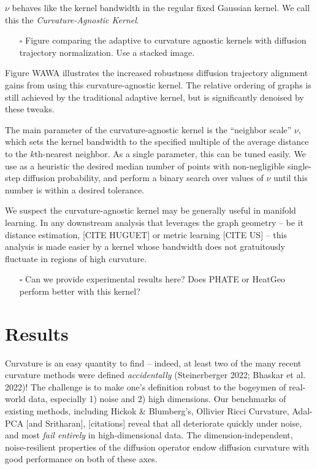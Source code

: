 \documentclass[
  letterpaper,
  DIV=11,
  numbers=noendperiod]{scrartcl}
\providecommand{\tightlist}{%
  \setlength{\itemsep}{0pt}\setlength{\parskip}{0pt}}\usepackage{longtable,booktabs,array}
\theoremstyle{plain}
\theoremstyle{definition}
\theoremstyle{plain}
\theoremstyle{definition}
\theoremstyle{plain}
\theoremstyle{remark}
\begin{document}
\(\nu\) behaves like the kernel bandwidth in the regular fixed Gaussian
kernel. We call this the \emph{Curvature-Agnostic Kernel}.

\begin{itemize}
\tightlist
\item[$\square$]
  Figure comparing the adaptive to curvature agnostic kernels with
  diffusion trajectory normalization. Use a stacked image.
\end{itemize}

Figure WAWA illustrates the increased robustness diffusion trajectory
alignment gains from using this curvature-agnostic kernel. The relative
ordering of graphs is still achieved by the traditional adaptive kernel,
but is significantly denoised by these tweaks.

The main parameter of the curvature-agnostic kernel is the ``neighbor
scale'' \(\nu\), which sets the kernel bandwidth to the specified
multiple of the average distance to the \(k\)th-nearest neighbor. As a
single parameter, this can be tuned easily. We use as a heuristic the
desired median number of points with non-negligible single-step
diffusion probability, and perform a binary search over values of
\(\nu\) until this number is within a desired tolerance.

We suspect the curvature-agnostic kernel may be generally useful in
manifold learning. In any downstream analysis that leverages the graph
geometry -- be it distance estimation, {[}CITE HUGUET{]} or metric
learning {[}CITE US{]} -- this analysis is made easier by a kernel whose
bandwidth does not gratuitously fluctuate in regions of high curvature.

\begin{itemize}
\tightlist
\item[$\square$]
  Can we provide experimental results here? Does PHATE or HeatGeo
  perform better with this kernel?
\end{itemize}

\section{Results}\label{results}

Curvature is an easy quantity to find -- indeed, at least two of the
many recent curvature methods were defined \emph{accidentally}
(Steinerberger 2022; Bhaskar et al. 2022)! The challenge is to make
one's definition robust to the bogeymen of real-world data, especially
1) noise and 2) high dimensions. Our benchmarks of existing methods,
including Hickok \& Blumberg's, Ollivier Ricci Curvature, Adal-PCA
{[}and Sritharan{]}, {[}citations{]} reveal that all deteriorate quickly
under noise, and most \emph{fail entirely} in high-dimensional data. The
dimension-independent, noise-resilient properties of the diffusion
operator endow diffusion curvature with good performance on both of
these axes.
\end{document}

